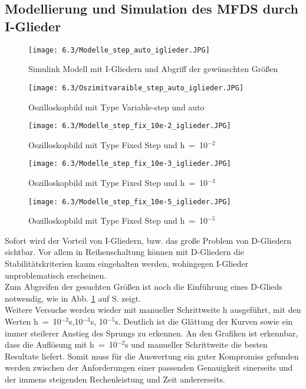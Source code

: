 \documentclass[12pt,a4paper]{scrartcl}	%
\begin{document}
\subsection{Modellierung und Simulation des MFDS durch I-Glieder}
\begin{figure}[]
	\centering
	\texttt{[image: 6.3/Modelle\_step\_auto\_iglieder.JPG]}
	\caption{Simulink Modell mit I-Gliedern und Abgriff der gewünschten Größen}
	\label{fig:oszoi}
\end{figure}
\begin{figure}[tbh] 
	\centering
	\texttt{[image: 6.3/Oszimitvaraible\_step\_auto\_iglieder.JPG]}
	\caption{Oszilloskopbild mit Type Variable-step und auto}
	
\end{figure}
\begin{figure}[tbh]
	\centering
	\texttt{[image: 6.3/Modelle\_step\_fix\_10e-2\_iglieder.JPG]}
	\caption{Oszilloskopbild mit Type Fixed Step und h~=~10$^{-2}$}
	\end{figure}
\begin{figure}[tbh]
	\centering
	\texttt{[image: 6.3/Modelle\_step\_fix\_10e-3\_iglieder.JPG]}
	\caption{Oszilloskopbild mit Type Fixed Step und h~=~10$^{-3}$}
\end{figure}
\begin{figure}[tbh]
	\centering
	\texttt{[image: 6.3/Modelle\_step\_fix\_10e-5\_iglieder.JPG]}
	\caption{Oszilloskopbild mit Type Fixed Step und h~=~10$^{-5}$}
\end{figure}
Sofort wird der Vorteil von I-Gliedern, bzw. das große Problem von D-Gliedern sichtbar.
Vor allem in Reihenschaltung können mit D-Gliedern die Stabilitätskriterien kaum eingehalten werden, wohingegen I-Glieder unproblematisch erscheinen.\\
Zum Abgreifen der gesuchten Größen ist noch die Einführung eines D-Glieds notwendig, wie in Abb. \ref{fig:oszoi} auf S. \pageref{fig:oszoi} zeigt.\\
Weitere Versuche werden wieder mit manueller Schrittweite h ausgeführt,
mit den Werten h~=~10$^{-2}$s,10$^{-3}$s, 10$^{-5}$s. Deutlich ist die Glättung der Kurven sowie ein immer steilerer Anstieg des Sprungs zu erkennen. An den Grafiken ist erkennbar, dass die Auflösung mit h~=~10$^{-2}$s und manueller Schrittweite die besten Resultate liefert. Somit muss für die Auswertung ein guter Kompromiss gefunden werden zwischen der Anforderungen einer passenden Genauigkeit einerseits und der immens steigenden Rechenleistung und Zeit andererseits.
\clearpage
\end{document}
